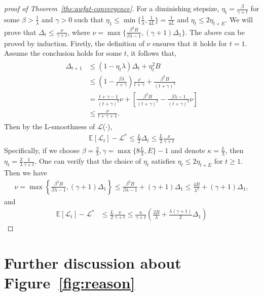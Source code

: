 \documentclass{article} %
\theoremstyle{plain}
\theoremstyle{definition}
\theoremstyle{remark}
\begin{document}
\begin{proof}[proof of Theorem~\ref{the:awfat-convergence}]
For a diminishing stepsize, $\eta_t=\frac{\beta}{\gamma+t}$ for some $\beta>\frac{1}{\lambda}$ and $\gamma>0$ such that $\eta_1\leq\min\{\frac{1}{\lambda},\frac{1}{4L}\}=\frac{1}{4L}$ and $\eta_t\leq 2\eta_{t+E}$. We will prove that $\Delta_t\leq\frac{\nu}{\gamma+t}$, where $\nu=\max\{\frac{\beta^2B}{\beta\lambda-1},(\gamma+1)\Delta_1\}$.
The above can be proved by induction. Firstly, the definition of $\nu$ ensures that it holds for $t=1$. Assume the conclusion holds for some $t$, it follows that,
\begin{align}
\begin{split}
    \Delta_{t+1} &\leq (1-\eta_t\lambda)\Delta_t +\eta_t^2B\\
    &\leq (1-\frac{\beta\lambda}{t+\gamma})\frac{\nu}{t+\gamma}+\frac{\beta^2B}{(t+\gamma)^2}\\
    & = \frac{t+\gamma-1}{(t+\gamma)^2}\nu + [\frac{\beta^2B}{(t+\gamma)^2}-\frac{\beta\lambda-1}{(t+\gamma)^2} \nu]\\
    &\leq \frac{\nu}{t+\gamma+1}.
\end{split}
\end{align}
Then by the L-smoothness of $\mathcal{L}$($\cdot$),
\begin{align}
    \mathbb{E}[\mathcal{L}_{t}]-\mathcal{L}^*\leq \frac{L}{2}\Delta_t\leq\frac{L}{2}\frac{\nu}{\gamma+t}
\end{align}
Specifically, if we choose $\beta=\frac{2}{\lambda},\gamma=\max\{8\frac{L}{\lambda},E\}-1$ and denote $\kappa=\frac{L}{\lambda}$, then $\eta_t=\frac{2}{\lambda}\frac{1}{\gamma+t}$. One can verify that the choice of $\eta_t$ satisfies $\eta_t\leq2\eta_{t+E}$ for $t\geq1$. Then we have
\begin{align}
    \nu = \max\left\{\frac{\beta^2B}{\beta\lambda-1},(\gamma+1)\Delta_1\right\}\leq\frac{\beta^2B}{\beta\lambda-1}+(\gamma+1)\Delta_1\leq \frac{4B}{\lambda^2}+(\gamma+1)\Delta_1,
\end{align}
and
\begin{align}
    \mathbb{E}[\mathcal{L}_{t}]-\mathcal{L}^*&\leq\frac{L}{2}\frac{\nu}{\gamma+t}\leq\frac{\kappa}{\gamma+t}\left(\frac{2B}{\lambda}+\frac{\lambda(\gamma+1)}{2}\Delta_1\right)
\end{align}
\end{proof}

\section{Further discussion about Figure~\ref{fig:reason}}
\label{app:just_figure_reason}
\end{document}
